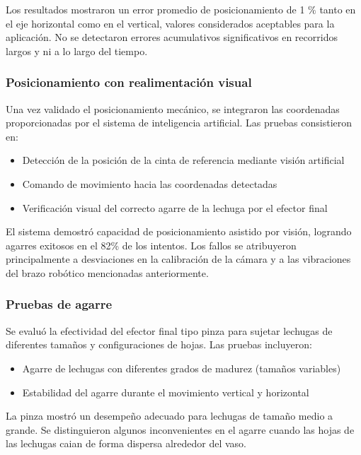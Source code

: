 Los resultados mostraron un error promedio de posicionamiento de 1 $\%$ tanto en el eje horizontal como en el vertical, valores considerados aceptables para la aplicación. No se detectaron errores acumulativos significativos en recorridos largos y ni a lo largo del tiempo.

\subsubsection{Posicionamiento con realimentación visual}

Una vez validado el posicionamiento mecánico, se integraron las coordenadas proporcionadas por el sistema de inteligencia artificial. Las pruebas consistieron en:

\begin{itemize}[label=$\bullet$]
    \item Detección de la posición de la cinta de referencia mediante visión artificial
    \item Comando de movimiento hacia las coordenadas detectadas
    \item Verificación visual del correcto agarre de la lechuga por el efector final
\end{itemize}

El sistema demostró capacidad de posicionamiento asistido por visión, logrando agarres exitosos en el 82\% de los intentos. Los fallos se atribuyeron principalmente a desviaciones en la calibración de la cámara y a las vibraciones del brazo robótico mencionadas anteriormente.

\subsubsection{Pruebas de agarre}

Se evaluó la efectividad del efector final tipo pinza para sujetar lechugas de diferentes tamaños y configuraciones de hojas. Las pruebas incluyeron:

\begin{itemize}[label=$\bullet$]
    \item Agarre de lechugas con diferentes grados de madurez (tamaños variables)
    \item Estabilidad del agarre durante el movimiento vertical y horizontal
\end{itemize}

La pinza mostró un desempeño adecuado para lechugas de tamaño medio a grande. Se distinguieron algunos inconvenientes en el agarre cuando las hojas de las lechugas caian de forma dispersa alrededor del vaso.

